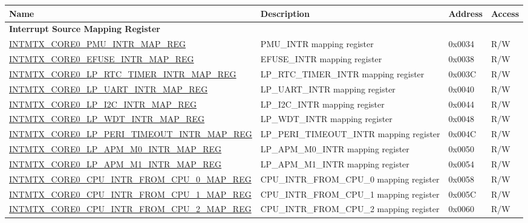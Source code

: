 \begin{longtable}{ | p{10cm} | p{10cm} | p{1.3cm} | p{1cm} | }
\hline\rowcolor{lightgray}
\textbf{Name} & \textbf{Description} &\textbf{Address} & \textbf{Access} \\ \hline
\endhead
\multicolumn{4}{|l|}{\textbf{Interrupt Source Mapping Register}} \\ \hline
\hyperref[regdesc:INTMTXCORE0PMUINTRMAPREG]{INTMTX\_CORE0\_PMU\_INTR\_MAP\_REG} & PMU\_INTR mapping register & 0x0034 & R/W \\ \hline
\hyperref[regdesc:INTMTXCORE0EFUSEINTRMAPREG]{INTMTX\_CORE0\_EFUSE\_INTR\_MAP\_REG} & EFUSE\_INTR mapping register & 0x0038 & R/W \\ \hline
\hyperref[regdesc:INTMTXCORE0LPRTCTIMERINTRMAPREG]{INTMTX\_CORE0\_LP\_RTC\_TIMER\_INTR\_MAP\_REG} & LP\_RTC\_TIMER\_INTR mapping register & 0x003C & R/W \\ \hline
\hyperref[regdesc:INTMTXCORE0LPUARTINTRMAPREG]{INTMTX\_CORE0\_LP\_UART\_INTR\_MAP\_REG} & LP\_UART\_INTR mapping register & 0x0040 & R/W \\ \hline
\hyperref[regdesc:INTMTXCORE0LPI2CINTRMAPREG]{INTMTX\_CORE0\_LP\_I2C\_INTR\_MAP\_REG} & LP\_I2C\_INTR mapping register & 0x0044 & R/W \\ \hline
\hyperref[regdesc:INTMTXCORE0LPWDTINTRMAPREG]{INTMTX\_CORE0\_LP\_WDT\_INTR\_MAP\_REG} & LP\_WDT\_INTR mapping register & 0x0048 & R/W \\ \hline
\hyperref[regdesc:INTMTXCORE0LPPERITIMEOUTINTRMAPREG]{INTMTX\_CORE0\_LP\_PERI\_TIMEOUT\_INTR\_MAP\_REG} & LP\_PERI\_TIMEOUT\_INTR mapping register & 0x004C & R/W \\ \hline
\hyperref[regdesc:INTMTXCORE0LPAPMM0INTRMAPREG]{INTMTX\_CORE0\_LP\_APM\_M0\_INTR\_MAP\_REG} & LP\_APM\_M0\_INTR mapping register & 0x0050 & R/W \\ \hline
\hyperref[regdesc:INTMTXCORE0LPAPMM1INTRMAPREG]{INTMTX\_CORE0\_LP\_APM\_M1\_INTR\_MAP\_REG} & LP\_APM\_M1\_INTR mapping register & 0x0054 & R/W \\ \hline
\hyperref[regdesc:INTMTXCORE0CPUINTRFROMCPU0MAPREG]{INTMTX\_CORE0\_CPU\_INTR\_FROM\_CPU\_0\_MAP\_REG} & CPU\_INTR\_FROM\_CPU\_0 mapping register & 0x0058 & R/W \\ \hline
\hyperref[regdesc:INTMTXCORE0CPUINTRFROMCPU1MAPREG]{INTMTX\_CORE0\_CPU\_INTR\_FROM\_CPU\_1\_MAP\_REG} & CPU\_INTR\_FROM\_CPU\_1 mapping register & 0x005C & R/W \\ \hline
\hyperref[regdesc:INTMTXCORE0CPUINTRFROMCPU2MAPREG]{INTMTX\_CORE0\_CPU\_INTR\_FROM\_CPU\_2\_MAP\_REG} & CPU\_INTR\_FROM\_CPU\_2 mapping register & 0x0060 & R/W \\ \hline

\end{longtable}
